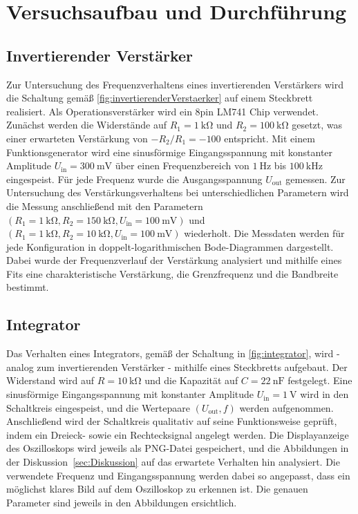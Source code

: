 \section{Versuchsaufbau und Durchführung}
\label{sec:Durchführung}

\subsection{Invertierender Verstärker}
\label{subsec:InvertierenderVerstaerker}
Zur Untersuchung des Frequenzverhaltens eines invertierenden Verstärkers wird die Schaltung gemäß \autoref{fig:invertierenderVerstaerker} 
auf einem Steckbrett realisiert. Als Operationsverstärker wird ein 8pin LM741 Chip verwendet.
Zunächst werden die Widerstände auf $R_1 = \qty{1}{\kilo\ohm}$ und $R_2 = \qty{100}{\kilo\ohm}$ gesetzt, was einer erwarteten Verstärkung von 
$-R_2/R_1 = -100$ entspricht. 
Mit einem Funktionsgenerator wird eine sinusförmige Eingangsspannung mit konstanter Amplitude 
$U_\text{in} = \qty{300}{\milli\volt}$ über einen Frequenzbereich von $\qty{1}{\hertz}$ bis $\qty{100}{\kilo\hertz}$ eingespeist.
Für jede Frequenz wurde die Ausgangsspannung $U_\text{out}$ gemessen.
Zur Untersuchung des Verstärkungsverhaltens bei unterschiedlichen Parametern wird die Messung anschließend mit den Parametern 
$(R_1 = \qty{1}{\kilo\ohm}, R_2 = \qty{150}{\kilo\ohm}, U_\text{in} = \qty{100}{\milli\volt})$ und 
$(R_1 = \qty{1}{\kilo\ohm}, R_2 = \qty{10}{\kilo\ohm}, U_\text{in} = \qty{100}{\milli\volt})$ wiederholt.
Die Messdaten werden für jede Konfiguration in doppelt-logarithmischen Bode-Diagrammen dargestellt. Dabei wurde der Frequenzverlauf der 
Verstärkung analysiert und mithilfe eines Fits eine charakteristische Verstärkung, die Grenzfrequenz und die Bandbreite bestimmt.

\subsection{Integrator}
\label{subsec:Integrator}
Das Verhalten eines Integrators, gemäß der Schaltung in \autoref{fig:integrator},
wird - analog zum invertierenden Verstärker - mithilfe eines Steckbretts aufgebaut. Der Widerstand wird auf $R = \qty{10}{\kilo\ohm}$
und die Kapazität auf $C = \qty{22}{\nano\farad}$ festgelegt. Eine sinusförmige Eingangsspannung mit konstanter Amplitude
$U_\text{in} = \qty{1}{\volt}$ wird in den Schaltkreis eingespeist, und die Wertepaare $(U_\text{out}, f)$ werden aufgenommen.
Anschließend wird der Schaltkreis qualitativ auf seine Funktionsweise geprüft, indem ein Dreieck- sowie ein Rechtecksignal angelegt werden.
Die Displayanzeige des Oszilloskops wird jeweils als PNG-Datei gespeichert, und die Abbildungen in der Diskussion~\ref{sec:Diskussion}
auf das erwartete Verhalten hin analysiert. Die verwendete Frequenz und Eingangsspannung werden dabei so angepasst,
dass ein möglichst klares Bild auf dem Oszilloskop zu erkennen ist. Die genauen Parameter sind jeweils in den Abbildungen ersichtlich.

